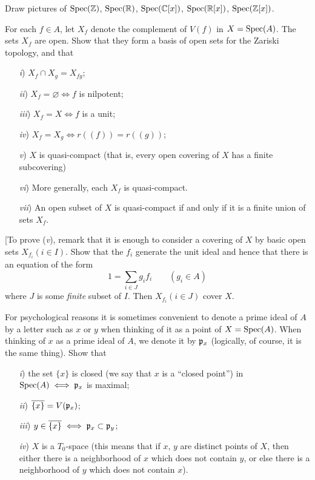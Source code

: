 \documentclass[10pt]{amsart}
\begin{document}
\begin{exercise}
    Draw pictures of $\operatorname{Spec}(\mathbb{Z})$, $\operatorname{Spec}(\mathbb{R})$, $\operatorname{Spec}(\mathbb{C}[x])$, $\operatorname{Spec}(\mathbb{R}[x])$, $\operatorname{Spec}(\mathbb{Z}[x])$.
\end{exercise}

\begin{exercise}
    For each $f\in A$, let $X_f$ denote the complement of $V(f)$ in $X = \operatorname{Spec}(A)$. The sets $X_f$ are open. Show that they form a 
    basis of open sets for the Zariski topology, and that
    \begin{itemize}
        \item[\emph{i})] $X_f \cap X_g = X_{fg}$;
        \item[\emph{ii})] $X_f = \varnothing \iff f$ is nilpotent;
        \item[\emph{iii})] $X_f = X \iff f$ is a unit;
        \item[\emph{iv})] $X_f = X_g \iff r((f)) = r((g))$;
        \item[\emph{v})] $X$ is quasi-compact (that is, every open covering of $X$ has a finite subcovering)
        \item[\emph{vi})] More generally, each $X_f$ is quasi-compact.
        \item[\emph{vii})] An open subset of $X$ is quasi-compact if and only if it is a finite union of
        sets $X_f$.
    \end{itemize}
    [To prove (\emph{v}), remark that it is enough to consider a covering of $X$ by basic open sets $X_{f_i} (i \in I)$. 
    Show that the $f_i$ generate the unit ideal and hence that there is an equation of the form
    \[
        1 = \sum_{i \in J}g_if_i \qquad (g_i \in A)   
    \]
    where $J$ is some \emph{finite} subset of $I$. Then $X_{f_i} (i \in J)$ cover $X$. 
\end{exercise}

\begin{exercise}
    For psychological reasons it is sometimes convenient to denote a prime ideal 
    of $A$ by a letter such as $x$ or $y$ when thinking of it as a point of $X= \operatorname{Spec}(A)$. 
    When thinking of $x$ as a prime ideal of $A$, we denote it by $\mathfrak{p}_x$ (logically, of course, 
    it is the same thing). Show that
    \begin{itemize}
        \item[\emph{i})] the set $\{x\}$ is closed (we say that $x$ is a ``closed point'') in 
        $\operatorname{Spec}(A) \iff \mathfrak{p}_x$ is maximal; 
        \item[\emph{ii})] $\overline{\{x\}} = V(\mathfrak{p}_x)$;
        \item[\emph{iii})] $y \in \overline{\{x\}} \iff \mathfrak{p}_x \subset \mathfrak{p}_y$;
        \item[\emph{iv})] $X$ is a $T_0$-space (this means that if $x$, $y$ are distinct points of $X$, then either
        there is a neighborhood of $x$ which does not contain $y$, or else there is a neighborhood of $y$ which does not contain $x$).
    \end{itemize}
\end{exercise}
\end{document}
